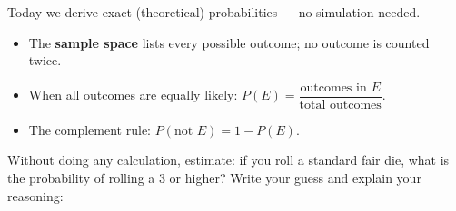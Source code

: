 \documentclass[10pt]{article}
\begin{document}
\vspace{0.12in}

\noindent Today we derive exact (theoretical) probabilities --- no simulation needed.

\vspace{0.14in}

\begin{tcolorbox}[colback=greenbg, colframe=greenacc, boxrule=0.8pt, arc=2mm,
    left=4mm, right=4mm, top=3mm, bottom=3mm]
    \small
    \begin{itemize}[leftmargin=1.3em, itemsep=8pt]
  \item The \textbf{sample space} lists every possible outcome; no outcome is counted twice.
  \item When all outcomes are equally likely: $P(E) = \dfrac{\text{outcomes in }E}{\text{total outcomes}}$.
  \item The complement rule: $P(\text{not }E) = 1 - P(E)$.
    \end{itemize}
\end{tcolorbox}

\vspace{0.2in}

\noindent\textcolor{slate}{\small Without doing any calculation, estimate: if you roll a
standard fair die, what is the probability of rolling a 3 or higher? Write your guess
and explain your reasoning:}\\[8pt]
\writeline\\[2pt]\writeline
\end{document}
